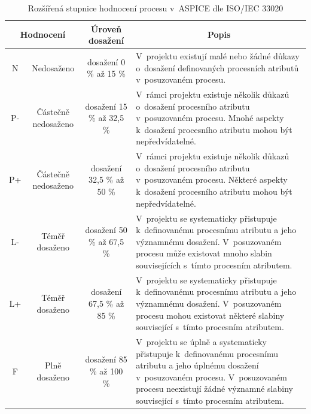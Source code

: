 \documentclass[czech,master]{diploma}
\begin{document}
\begin{table}[htp]
\begin{center}
\begin{tabular}{c | c | c | m{6cm}}

\multicolumn{2}{c|}{\textbf{Hodnocení}} & \multicolumn{1}{c|}{\textbf{Úroveň dosažení}} & \multicolumn{1}{c}{\textbf{Popis}} \\
\hline
\hline
N  & Nedosaženo & dosažení 0 \% až 15 \% & V~projektu existují malé nebo žádné důkazy o~dosažení definovaných procesních atributů v~posuzovaném procesu. \\
\hline
P- & Částečně nedosaženo & dosažení 15 \% až  32,5 \% & V~rámci projektu existuje několik důkazů o~dosažení procesního atributu v~posuzovaném procesu. Mnohé aspekty k~dosažení procesního atributu mohou být nepředvídatelné. \\
\hline
P+ & Částečně nedosaženo & dosažení  32,5 \% až 50 \% & V~rámci projektu existuje několik důkazů o~dosažení procesního atributu v~posuzovaném procesu. Některé aspekty k~dosažení procesního atributu mohou být nepředvídatelné. \\
\hline
L- & Téměř dosaženo & dosažení  50 \% až 67,5 \% & V~projektu se systematicky přistupuje k~definovanému procesnímu atributu a jeho významnému dosažení. V~posuzovaném procesu může existovat mnoho slabin souvisejících s~tímto procesním atributem. \\
\hline
L+ & Téměř dosaženo  & dosažení  67,5 \% až 85 \% & V~projektu se systematicky přistupuje k~definovanému procesnímu atributu a jeho významnému dosažení. V~posuzovaném procesu mohou existovat některé slabiny související s~tímto procesním atributem. \\
\hline
F  & Plně dosaženo & dosažení  85 \% až 100 \% & V~projektu se úplně a systematicky přistupuje k~definovanému procesnímu atributu a jeho úplnému dosažení v~posuzovaném procesu. V~posuzovaném procesu neexistují žádné významné slabiny související s~tímto procesním atributem. \\
\end{tabular}
\caption{Rozšířená stupnice hodnocení procesu v~ASPICE dle ISO/IEC 33020 \cite{ref:aspice_download_1523}}
\label{tab:aspice_rating_scale}
\end{center}
\end{table}
\end{document}
